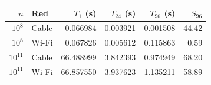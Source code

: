 \begin{center}
\small
\begin{tabular}{rlrrrr}
\toprule
$n$ & Red & $T_1$ (s) & $T_{24}$ (s) & $T_{96}$ (s) & $S_{96}$ \\
\midrule
$10^8$ & Cable & 0.066984 & 0.003921 & 0.001508 & 44.42 \\
$10^8$ & Wi-Fi & 0.067826 & 0.005612 & 0.115863 & 0.59 \\
$10^{11}$ & Cable & 66.488999 & 3.842393 & 0.974949 & 68.20 \\
$10^{11}$ & Wi-Fi & 66.857550 & 3.937623 & 1.135211 & 58.89 \\
\bottomrule
\end{tabular}
\end{center}
